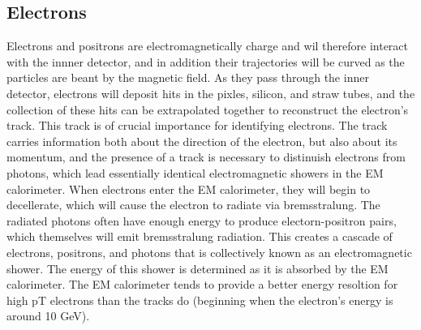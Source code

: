 

\subsection{Electrons}
Electrons and positrons are electromagnetically charge and wil therefore interact with the innner detector, and in addition their trajectories will be curved as the particles are beant by the magnetic field.
As they pass through the inner detector, electrons will deposit hits in the pixles, silicon, and straw tubes, and the collection of these hits can be extrapolated together to reconstruct the electron's track.
This track is of crucial importance for identifying electrons.
The track carries information both about the direction of the electron, but also about its momentum, and the presence of a track is necessary to distinuish electrons from photons, which lead essentially identical electromagnetic showers in the EM calorimeter.
When electrons enter the EM calorimeter, they will begin to decellerate, which will cause the electron to radiate via bremsstralung.
The radiated photons often have enough energy to produce electorn-positron pairs, which themselves will emit bremsstralung radiation.
This creates a cascade of electrons, positrons, and photons that is collectively known as an electromagnetic shower.
The energy of this shower is determined as it is absorbed by the EM calorimeter.
The EM calorimeter tends to provide a better energy resoltion for high pT electrons than the tracks do (beginning when the electron's energy is around 10 GeV).

